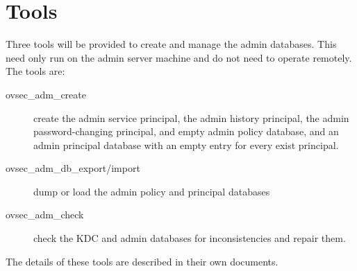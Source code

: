 \section{Tools}

Three tools will be provided to create and manage the admin databases.
This need only run on the admin server machine and do not need to
operate remotely.  The tools are:

\begin{description}
\item[ovsec_adm_create] create the admin service principal, the admin
history principal, the admin password-changing principal, and empty
admin policy database, and an admin principal database with an empty
entry for every exist principal.
\item[ovsec_adm_db_export/import] dump or load the admin policy and
principal databases
\item[ovsec_adm_check] check the KDC and admin databases for
inconsistencies and repair them.
\end{description}

The details of these tools are described in their own documents.


